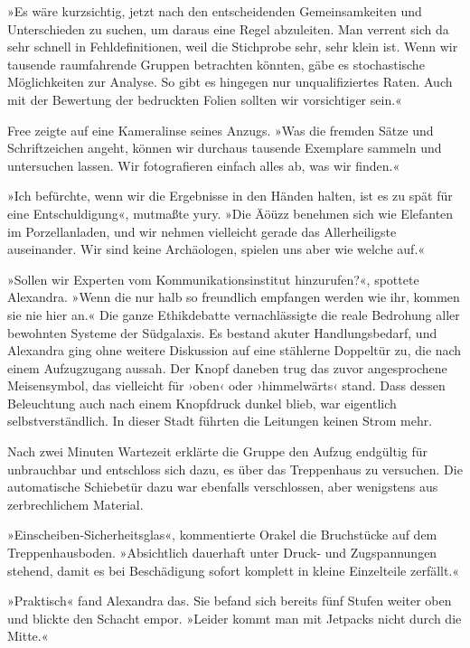 »Es wäre kurzsichtig, jetzt nach den entscheidenden Gemeinsamkeiten und Unterschieden zu suchen, um daraus eine Regel abzuleiten. Man verrent sich da sehr schnell in Fehldefinitionen, weil die Stichprobe sehr, sehr klein ist. Wenn wir tausende raumfahrende Gruppen betrachten könnten, gäbe es stochastische Möglichkeiten zur Analyse. So gibt es hingegen nur unqualifiziertes Raten. Auch mit der Bewertung der bedruckten Folien sollten wir vorsichtiger sein.«

Free zeigte auf eine Kameralinse seines Anzugs. »Was die fremden Sätze und Schriftzeichen angeht, können wir durchaus tausende Exemplare sammeln und untersuchen lassen. Wir fotografieren einfach alles ab, was wir finden.«

»Ich befürchte, wenn wir die Ergebnisse in den Händen halten, ist es zu spät für eine Entschuldigung«, mutmaßte yury. »Die Äöüzz benehmen sich wie Elefanten im Porzellanladen, und wir nehmen vielleicht gerade das Allerheiligste auseinander. Wir sind keine Archäologen, spielen uns aber wie welche auf.«

»Sollen wir Experten vom Kommunikationsinstitut hinzurufen?«, spottete Alexandra. »Wenn die nur halb so freundlich empfangen werden wie ihr, kommen sie nie hier an.« Die ganze Ethikdebatte vernachlässigte die reale Bedrohung aller bewohnten Systeme der Südgalaxis. Es bestand akuter Handlungsbedarf, und Alexandra ging ohne weitere Diskussion auf eine stählerne Doppeltür zu, die nach einem Aufzugzugang aussah. Der Knopf daneben trug das zuvor angesprochene Meisensymbol, das vielleicht für ›oben‹ oder ›himmelwärts‹ stand. Dass dessen Beleuchtung auch nach einem Knopfdruck dunkel blieb, war eigentlich selbstverständlich. In dieser Stadt führten die Leitungen keinen Strom mehr.

Nach zwei Minuten Wartezeit erklärte die Gruppe den Aufzug endgültig für unbrauchbar und entschloss sich dazu, es über das Treppenhaus zu versuchen. Die automatische Schiebetür dazu war ebenfalls verschlossen, aber wenigstens aus zerbrechlichem Material.

»Einscheiben-Sicherheitsglas«, kommentierte Orakel die Bruchstücke auf dem Treppenhausboden. »Absichtlich dauerhaft unter Druck- und Zugspannungen stehend, damit es bei Beschädigung sofort komplett in kleine Einzelteile zerfällt.«

»Praktisch« fand Alexandra das. Sie befand sich bereits fünf Stufen weiter oben und blickte den Schacht empor. »Leider kommt man mit Jetpacks nicht durch die Mitte.«

